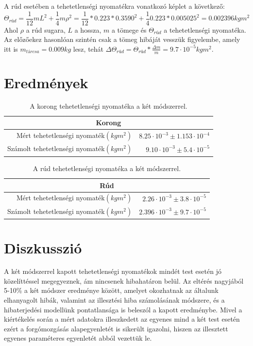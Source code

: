 \documentclass[10pt,pdftex]{report}
\begin{document}
A rúd esetében a tehetetlenségi nyomatékra vonatkozó képlet a következő:
\begin{equation*}
    \Theta_{rúd}=\frac{1}{12}mL^2+\frac{1}{4}m\rho^2=\frac{1}{12}*0.223*0.3590^2+\frac{1}{4}0.223*0.005025^2=0.002396kgm^2
\end{equation*}
Ahol $\rho$ a rúd sugara, $L$ a hossza, $m$ a tömege és $\Theta_{rúd}$ a tehetetlenségi nyomatéka.
Az előzőekez hasonlóan szintén csak a tömeg hibáját vesszük figyelembe, amely itt is $m_{tárcsa}=0.009kg$ lesz, tehát $\Delta \Theta_{rúd}=\Theta_{rúd}*\frac{\Delta m}{m}=9.7\cdot 10^{-5}kgm^2$.
\section*{Eredmények}
\begin{table}[H]
    \centering
    \begin{tabular}{|r|r|}
        \hline
        \multicolumn{2}{|c|}{Korong} \\
        \hline
        Mért tehetetlenségi nyomaték$(kgm^2)$ & $8.25\cdot 10^{-3}\pm{1.153\cdot 10^{-4}}$ \\
        \hline
        Számolt tehetetlenségi nyomaték$(kgm^2)$ & $9.10\cdot 10^{-3}\pm 5.4\cdot 10^{-5}$ \\
        \hline
    \end{tabular}
    \caption{A korong tehetetlenségi nyomatéka a két módszerrel.}
\end{table}
\begin{table}[H]
    \centering
    \begin{tabular}{|r|r|}
        \hline
        \multicolumn{2}{|c|}{Rúd} \\
        \hline
        Mért tehetetlenségi nyomaték$(kgm^2)$ & $2.26\cdot 10^{-3}\pm3.8\cdot 10^{-5}$ \\
        \hline
        Számolt tehetetlenségi nyomaték$(kgm^2)$ & $2.396\cdot 10^{-3}\pm9.7\cdot 10^{-5} $ \\
        \hline
    \end{tabular}
    \caption{A rúd tehetetlenségi nyomatéka a két módszerrel.}
\end{table}
\section*{Diszkusszió}
A két módszerrel kapott tehetetlenségi nyomatékok mindét test esetén jó közelíttéssel megegyeznek, ám nincsenek hibahatáron belül. Az eltérés nagyjából 5-10\% a két módszer eredménye között, amelyet okozhatnak az általunk elhanyagolt hibák, valamint az illesztési hiba számolásának módszere, és a hibaterjedési modellünk pontatlansága is beleszól a kapott eredménybe. Mivel a kiértékelés során a mért adatokra illeszkedett az egyenes mind a két test esetén ezért a forgómozgásás alapegyenletét is sikerült igazolni, hiszen az illesztett egyenes paraméteres egyenletét abból vezettük le.
\end{document}
